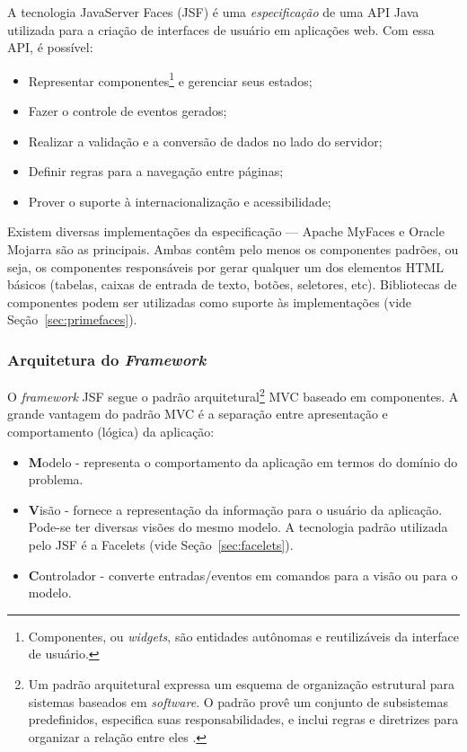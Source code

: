 \documentclass[
  10.5pt,				  %
	openright,			%
	twoside,			  %
  a5paper,
  chapter=TITLE,	%
	section=TITLE,	%
  hyphens,        %
	english,        %
	brazil          %
]{abntex2}
\begin{document}
A tecnologia JavaServer Faces (JSF) é uma \emph{especificação} de uma API Java utilizada para a criação de interfaces de usuário em aplicações web. Com essa API, é possível:
%
\begin{itemize}
  \item Representar componentes\footnote{Componentes, ou \emph{widgets}, são entidades autônomas e reutilizáveis da interface de usuário.} e gerenciar seus estados;
  \item Fazer o controle de eventos gerados;
  \item Realizar a validação e a conversão de dados no lado do servidor;
  \item Definir regras para a navegação entre páginas;
  \item Prover o suporte à internacionalização e acessibilidade;
\end{itemize}
%

Existem diversas implementações da especificação --- Apache MyFaces e Oracle Mojarra são as principais. Ambas contêm pelo menos os componentes padrões, ou seja, os componentes responsáveis por gerar qualquer um dos elementos HTML básicos (tabelas, caixas de entrada de texto, botões, seletores, etc). Bibliotecas de componentes podem ser utilizadas como suporte às implementações (vide Seção~\ref{sec:primefaces}).


\subsubsection{Arquitetura do \emph{Framework}}

O \emph{framework} JSF segue o padrão arquitetural\footnote{Um padrão arquitetural expressa um esquema de organização estrutural para sistemas baseados em \emph{software}. O padrão provê um conjunto de subsistemas predefinidos, especifica suas responsabilidades, e inclui regras e diretrizes para organizar a relação entre eles \cite{buschmann96}.} MVC baseado em componentes. A grande vantagem do padrão MVC é a separação entre apresentação e comportamento (lógica) da aplicação:

\begin{itemize}
  \item \textbf{M}odelo - representa o comportamento da aplicação em termos do domínio do problema.
  \item \textbf{V}isão - fornece a representação da informação para o usuário da aplicação. Pode-se ter diversas visões do mesmo modelo. A tecnologia padrão utilizada pelo JSF é a Facelets (vide Seção~\ref{sec:facelets}).
  \item \textbf{C}ontrolador - converte entradas/eventos em comandos para a visão ou para o modelo.
\end{itemize}
\end{document}
